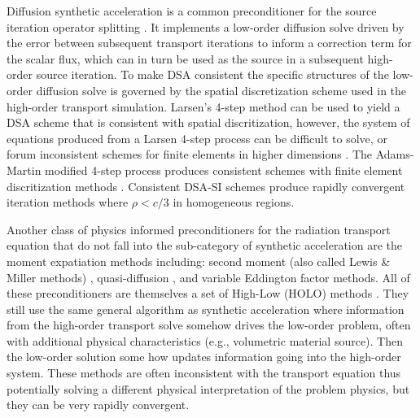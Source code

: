 Diffusion synthetic acceleration is a common preconditioner for the source iteration operator splitting \cite{adams_fast_2002, alcouffe_1977_dd, coale_2025_dsa}.
It implements a low-order diffusion solve driven by the error between subsequent transport iterations to inform a correction term for the scalar flux, which can in turn be used as the source in a subsequent high-order source iteration.
To make DSA consistent the specific structures of the low-order diffusion solve is governed by the spatial discretization scheme used in the high-order transport simulation.
Larsen's 4-step method can be used to yield a DSA scheme that is consistent with spatial discritization, however, the system of equations produced from a Larsen 4-step process can be difficult to solve, or forum inconsistent schemes for finite elements in higher dimensions \cite{larsen_1982_unconDSA, larsen_1982_unconDSAte, haut_2020_dsa}. 
The Adams-Martin modified 4-step process produces consistent schemes with finite element discritization methods \cite{adams_1992_dsadfe}.
Consistent DSA-SI schemes produce rapidly convergent iteration methods where $\rho<c/3$ in homogeneous regions.

Another class of physics informed preconditioners for the radiation transport equation that do not fall into the sub-category of synthetic acceleration are the moment expatiation methods including: second moment (also called Lewis \& Miller methods) \cite{olivier_2024_smoms, lewis_computational_1984, oliver_2025_secondmoment}, quasi-diffusion \cite{ani_1986_quasidiffusion, goldin_1964_quasidissuion}, and variable Eddington factor \cite{lou_2021_vef, coale_2024_rmomvef} methods.
All of these preconditioners are themselves a set of High-Low (HOLO) methods \cite{chacon_2017_holosurvey}.
They still use the same general algorithm as synthetic acceleration where information from the high-order transport solve somehow drives the low-order problem, often with additional physical characteristics (e.g., volumetric material source).
Then the low-order solution some how updates information going into the high-order system.
These methods are often inconsistent with the transport equation thus potentially solving a different physical interpretation of the problem physics, but they can be very rapidly convergent.

